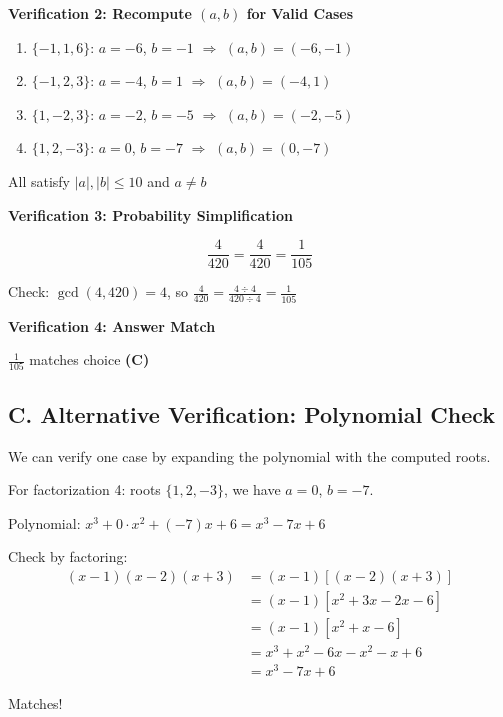 \documentclass[12pt]{article}
\begin{document}
\begin{solutionbox}
\textbf{Verification 2: Recompute $(a,b)$ for Valid Cases}

\begin{enumerate}
    \item $\{-1, 1, 6\}$: $a = -6$, $b = -1$ $\Rightarrow$ $(a,b) = (-6, -1)$ \checkmark
    \item $\{-1, 2, 3\}$: $a = -4$, $b = 1$ $\Rightarrow$ $(a,b) = (-4, 1)$ \checkmark
    \item $\{1, -2, 3\}$: $a = -2$, $b = -5$ $\Rightarrow$ $(a,b) = (-2, -5)$ \checkmark
    \item $\{1, 2, -3\}$: $a = 0$, $b = -7$ $\Rightarrow$ $(a,b) = (0, -7)$ \checkmark
\end{enumerate}

All satisfy $|a|, |b| \leq 10$ and $a \neq b$ \checkmark

\textbf{Verification 3: Probability Simplification}

$$\frac{4}{420} = \frac{4}{420} = \frac{1}{105}$$ 

Check: $\gcd(4, 420) = 4$, so $\frac{4}{420} = \frac{4 \div 4}{420 \div 4} = \frac{1}{105}$ \checkmark

\textbf{Verification 4: Answer Match}

$\frac{1}{105}$ matches choice \textbf{(C)} \checkmark

\subsection*{C. Alternative Verification: Polynomial Check}

We can verify one case by expanding the polynomial with the computed roots.

For factorization 4: roots $\{1, 2, -3\}$, we have $a = 0$, $b = -7$.

Polynomial: $x^3 + 0 \cdot x^2 + (-7)x + 6 = x^3 - 7x + 6$

Check by factoring:
\begin{align*}
    (x - 1)(x - 2)(x + 3) &= (x - 1)[(x - 2)(x + 3)] \\
    &= (x - 1)[x^2 + 3x - 2x - 6] \\
    &= (x - 1)[x^2 + x - 6] \\
    &= x^3 + x^2 - 6x - x^2 - x + 6 \\
    &= x^3 - 7x + 6
\end{align*}

Matches! \checkmark

\end{solutionbox}
\end{document}

